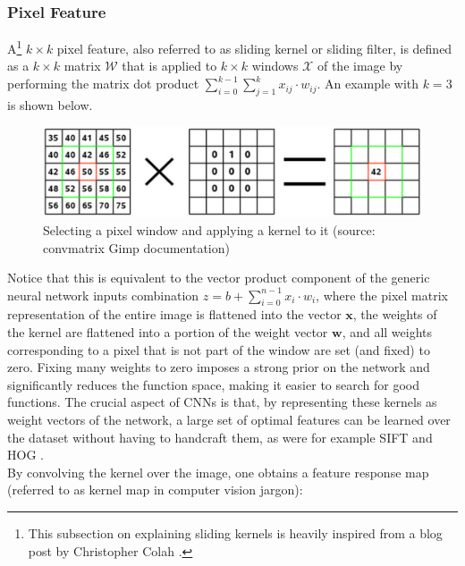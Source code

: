 \documentclass[a4paper,11pt]{article}
\begin{document}
\subsubsection{Pixel Feature}

A\footnote{This subsection on explaining sliding kernels is heavily inspired from a blog post by Christopher Colah \cite{colah}.} $k \times k$ pixel feature, also referred to as sliding kernel or sliding filter, is defined as a $k \times k$ matrix $\mathcal{W}$ that is applied to $k \times k$ windows $\mathcal{X}$ of the image by performing  the matrix dot product $\sum_{i=0}^{k-1} \sum_{j=1}^{k} x_{ij} \cdot w_{ij}$. An example with $k=3$ is shown below.

\begin{figure}[h!]
	\centering
	\includegraphics[scale=0.3]{images/window_x_kernel.png}
	\caption{Selecting a pixel window and applying a kernel to it (source: convmatrix Gimp documentation)}
\end{figure}

Notice that this is equivalent to the vector product component of the generic neural network inputs combination $z = b + \sum\limits_{i=0}^{n-1} x_{i}\cdot w_{i}$, where the pixel matrix representation of the entire image is flattened into the vector $\textbf{x}$, the weights of the kernel are flattened into a portion of the weight vector $\textbf{w}$, and all weights corresponding to a pixel that is not part of the window are set (and fixed) to zero. Fixing many weights to zero imposes a strong prior on the network and significantly reduces the function space, making it easier to search for good functions. The crucial aspect of CNNs is that, by representing these kernels as weight vectors of the network, a large set of optimal features can be learned over the dataset without having to handcraft them, as were for example SIFT and HOG \cite{SIFT}. \\

By convolving the kernel over the image, one obtains a feature response map (referred to as kernel map in computer vision jargon):
\end{document}
